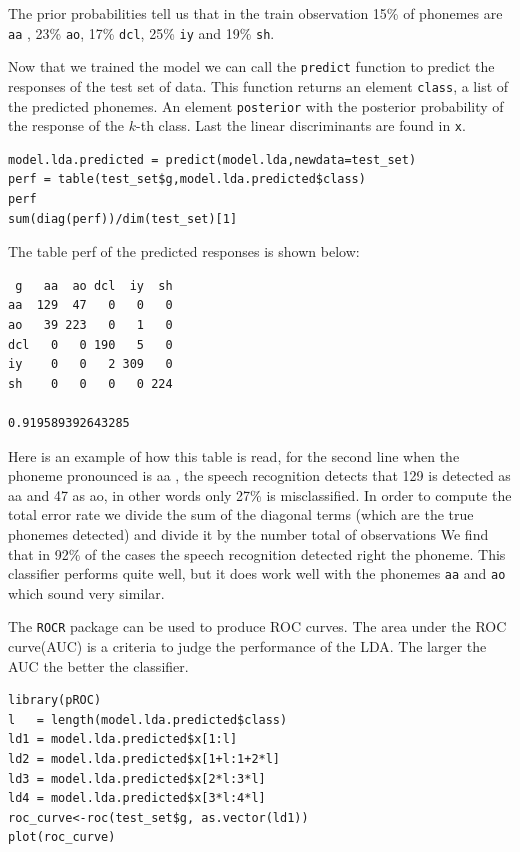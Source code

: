 \documentclass[]{report}
\begin{document}
The prior probabilities tell us that in the train observation 15\% of phonemes are \texttt{aa} , 23\% \texttt{ao}, 17\% \texttt{dcl}, 25\% \texttt{iy} and 19\% \texttt{sh}.

Now that we trained the model we can call the \texttt{predict} function to predict the responses of the test set of data. This function returns an element \texttt{class}, a list of the predicted phonemes. An element \texttt{posterior} with the posterior probability of the response of the $k$-th class.  Last the linear discriminants are found in \texttt{x}.

\begin{lstlisting}
model.lda.predicted = predict(model.lda,newdata=test_set)
perf = table(test_set$g,model.lda.predicted$class)
perf
sum(diag(perf))/dim(test_set)[1]
\end{lstlisting}

The table perf of the predicted responses is shown below:
\begin{center}
\begin{verbatim}
 g 	 aa  ao dcl  iy  sh
aa  129  47   0   0   0
ao   39 223   0   1   0
dcl   0   0 190   5   0
iy    0   0   2 309   0
sh    0   0   0   0 224

0.919589392643285
\end{verbatim}
\end{center}

Here is an example of how this table is read, for the second line
when the phoneme pronounced is aa , the speech recognition detects that 129 is detected as aa and 47 as ao, in other words only 27\% is misclassified.
In order to compute the total error rate we divide the sum of the diagonal terms (which are the true phonemes detected) and divide it by the number total of observations We find that in 92\% of the cases the speech recognition detected right the phoneme. This classifier performs quite well, but it does work well with the phonemes \texttt{aa} and \texttt{ao} which sound very similar.

The \texttt{ROCR} package can be used to produce ROC curves. The area under the ROC curve(AUC) is a criteria to judge the performance of the LDA. The larger the AUC the better the classifier.
\begin{lstlisting}
library(pROC)
l   = length(model.lda.predicted$class)
ld1 = model.lda.predicted$x[1:l]
ld2 = model.lda.predicted$x[1+l:1+2*l]
ld3 = model.lda.predicted$x[2*l:3*l]
ld4 = model.lda.predicted$x[3*l:4*l]
roc_curve<-roc(test_set$g, as.vector(ld1))
plot(roc_curve)
\end{lstlisting}
\end{document}
